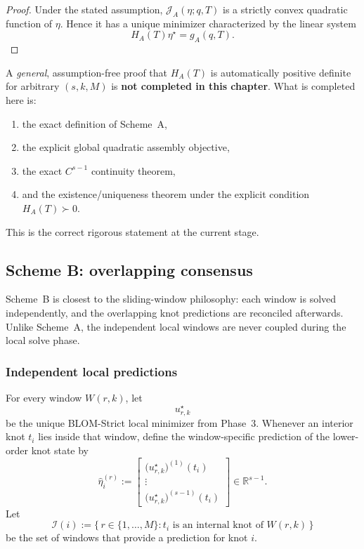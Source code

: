 \begin{proof}
Under the stated assumption, \(\mathcal J_A(\eta;q,T)\) is a strictly convex quadratic function of \(\eta\).
Hence it has a unique minimizer characterized by the linear system
\[
H_A(T)\eta^\star=g_A(q,T).
\]
\end{proof}

\begin{remark}
\label{rem:phase5_schemeA_limitation}
A \emph{general}, assumption-free proof that \(H_A(T)\) is automatically positive definite for arbitrary \((s,k,M)\) is \textbf{not completed in this chapter}.
What is completed here is:
\begin{enumerate}
    \item the exact definition of Scheme~A,
    \item the explicit global quadratic assembly objective,
    \item the exact \(C^{s-1}\) continuity theorem,
    \item and the existence/uniqueness theorem under the explicit condition \(H_A(T)\succ 0\).
\end{enumerate}
This is the correct rigorous statement at the current stage.
\end{remark}

\subsection{Scheme B: overlapping consensus}
\label{subsec:phase5_schemeB}

Scheme~B is closest to the sliding-window philosophy:
each window is solved independently, and the overlapping knot predictions are reconciled afterwards.
Unlike Scheme~A, the independent local windows are never coupled during the local solve phase.

\subsubsection{Independent local predictions}
\label{subsubsec:phase5_schemeB_local_predictions}

For every window \(W(r,k)\), let
\[
u_{r,k}^\star
\]
be the unique BLOM-Strict local minimizer from Phase~3.
Whenever an interior knot \(t_i\) lies inside that window, define the window-specific prediction of the lower-order knot state by
\begin{equation}
\label{eq:phase5_local_eta_prediction}
\widehat\eta_i^{(r)}
:=
\begin{bmatrix}
\bigl(u_{r,k}^\star\bigr)^{(1)}(t_i)\\
\vdots\\
\bigl(u_{r,k}^\star\bigr)^{(s-1)}(t_i)
\end{bmatrix}
\in\mathbb R^{s-1}.
\end{equation}
Let
\[
\mathcal I(i):=\{\,r\in\{1,\dots,M\}: t_i \text{ is an internal knot of } W(r,k)\,\}
\]
be the set of windows that provide a prediction for knot \(i\).

